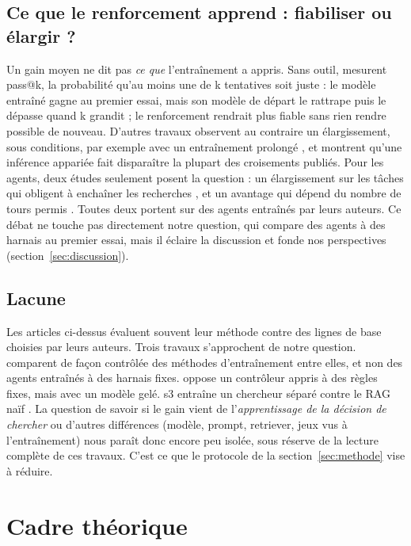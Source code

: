 \documentclass[11pt,a4paper]{article}
\begin{document}
\subsection{Ce que le renforcement apprend : fiabiliser ou élargir ?}
Un gain moyen ne dit pas \emph{ce que} l'entraînement a appris. Sans outil, \citet{yue2025does} mesurent pass@k, la probabilité qu'au moins une de k tentatives soit juste : le modèle entraîné gagne au premier essai, mais son modèle de départ le rattrape puis le dépasse quand k grandit ; le renforcement rendrait plus fiable sans rien rendre possible de nouveau. D'autres travaux observent au contraire un élargissement, sous conditions, par exemple avec un entraînement prolongé \citep{liu2025prorl}, et \citet{yang2026crossovers} montrent qu'une inférence appariée fait disparaître la plupart des croisements publiés. Pour les agents, deux études seulement posent la question : un élargissement sur les tâches qui obligent à enchaîner les recherches \citep{zhai2026does}, et un avantage qui dépend du nombre de tours permis \citep{zhu2026what}. Toutes deux portent sur des agents entraînés par leurs auteurs. Ce débat ne touche pas directement notre question, qui compare des agents à des harnais au premier essai, mais il éclaire la discussion et fonde nos perspectives (section~\ref{sec:discussion}).

\subsection{Lacune}
Les articles ci-dessus évaluent souvent leur méthode contre des lignes de base choisies par leurs auteurs. Trois travaux s'approchent de notre question. \citet{zhao2026retrieval} comparent de façon contrôlée des méthodes d'entraînement entre elles, et non des agents entraînés à des harnais fixes. \citet{raikote2026policy} oppose un contrôleur appris à des règles fixes, mais avec un modèle gelé. s3 entraîne un chercheur séparé contre le RAG naïf \citep{jiang2025s3}. La question de savoir si le gain vient de l'\emph{apprentissage de la décision de chercher} ou d'autres différences (modèle, prompt, retriever, jeux vus à l'entraînement) nous paraît donc encore peu isolée, sous réserve de la lecture complète de ces travaux. C'est ce que le protocole de la section~\ref{sec:methode} vise à réduire.

\section{Cadre théorique}\label{sec:cadre}
\end{document}
